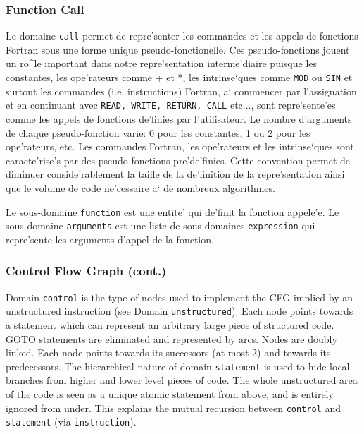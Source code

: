 \subsubsection{Function Call}
\label{subsubsection-call}

{}

Le domaine \verb/call/ permet de repre'senter les commandes et les
appels de fonctions Fortran sous une forme unique pseudo-fonctionelle.
Ces pseudo-fonctions jouent un ro^le important dans notre
repre'sentation interme'diaire puisque les constantes, les ope'rateurs
comme + et *, les intrinse`ques comme {\tt MOD} ou {\tt SIN} et surtout
les commandes (i.e. instructions) Fortran, a` commencer par
l'assignation et en continuant avec {\tt READ, WRITE, RETURN, CALL}
etc..., sont repre'sente'es comme les appels de fonctions de'finies par
l'utilisateur. Le nombre d'arguments de chaque pseudo-fonction varie: 0
pour les constantes, 1 ou 2 pour les ope'rateurs, etc. Les commandes
Fortran, les ope'rateurs et les intrinse`ques sont caracte'rise's par
des pseudo-fonctions pre'de'finies. Cette convention permet de diminuer
conside'rablement la taille de la de'finition de la repre'sentation
ainsi que le volume de code ne'cessaire a` de nombreux algorithmes.

Le sous-domaine \verb/function/ est une entite' qui de'finit la fonction
appele'e. Le sous-domaine \verb/arguments/ est une liste de sous-domaines
\verb/expression/ qui repre'sente les arguments d'appel de la fonction.

\subsubsection{Control Flow Graph (cont.)}
\label{subsubsection-control}

{}


Domain \verb/control/ is the type of nodes used to implement the CFG
implied by an unstructured instruction (see Domain
\verb/unstructured/). Each node points towards a statement which can
represent an arbitrary large piece of structured code. GOTO statements
are eliminated and represented by arcs. Nodes are doubly linked. Each
node points towards its successors (at most 2) and towards its
predecessors. The hierarchical nature of
domain \verb/statement/ is used to hide local branches from higher and
lower level pieces of code. The whole unstructured area of the code is
seen as a unique atomic statement from above, and is entirely ignored
from under. This explains the mutual recursion between \verb/control/
and \verb/statement/ (via \verb/instruction/).

